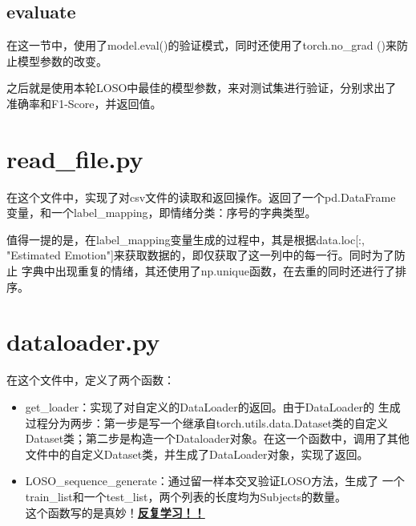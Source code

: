 \documentclass[AutoFakeBold]{MyFormat}
\begin{document}
\subsection{evaluate}
\par 在这一节中，使用了model.eval()的验证模式，同时还使用了torch.no\_grad
()来防止模型参数的改变。
\par 之后就是使用本轮LOSO中最佳的模型参数，来对测试集进行验证，分别求出了
准确率和F1-Score，并返回值。


\section{read\_file.py}
\par 在这个文件中，实现了对csv文件的读取和返回操作。返回了一个pd.DataFrame
变量，和一个label\_mapping，即{情绪分类：序号}的字典类型。
\par 值得一提的是，在label\_mapping变量生成的过程中，其是根据data.loc[:, 
"Estimated Emotion"]来获取数据的，即仅获取了这一列中的每一行。同时为了防止
字典中出现重复的情绪，其还使用了np.unique函数，在去重的同时还进行了排序。

\section{dataloader.py}
\par 在这个文件中，定义了两个函数：
\begin{itemize}
    \item get\_loader：实现了对自定义的DataLoader的返回。由于DataLoader的
    生成过程分为两步：第一步是写一个继承自torch.utils.data.Dataset类的自定义
    Dataset类；第二步是构造一个Dataloader对象。在这一个函数中，调用了其他
    文件中的自定义Dataset类，并生成了DataLoader对象，实现了返回。
    \item LOSO\_sequence\_generate：通过留一样本交叉验证LOSO方法，生成了
    一个train\_list和一个test\_list，两个列表的长度均为Subjects的数量。\\
    这个函数写的是真妙！\textbf{\Large \underline{反复学习！！}}
\end{itemize}
\end{document}
